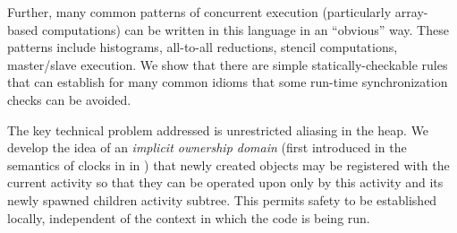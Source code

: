 Further, many common patterns of concurrent execution (particularly
array-based computations) can be written in this language in an
``obvious'' way. These patterns include histograms, all-to-all
reductions, stencil computations, master/slave execution.  We show
that there are simple statically-checkable rules that can establish
for many common idioms that some run-time synchronization checks can
be avoided.

The key technical problem addressed is unrestricted aliasing in the
heap.  We develop the idea of an {\em implicit ownership domain}
(first introduced in the semantics of clocks in \Xten{} in
\cite{vj-clock}) that newly created objects may be registered with
the current activity so that they can be operated upon only by this
activity and its newly spawned children activity subtree.  This
permits safety to be established locally, independent of the context
in which the code is being run.

